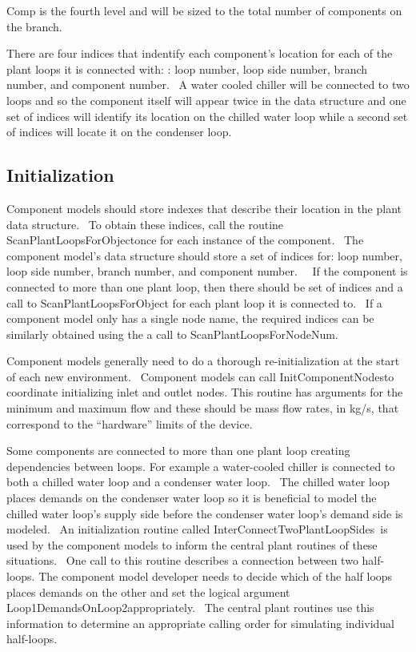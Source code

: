 Comp is the fourth level and will be sized to the total number of components on the branch.

There are four indices that indentify each component's location for each of the plant loops it is connected with: : loop number, loop side number, branch number, and component number.~ A water cooled chiller will be connected to two loops and so the component itself will appear twice in the data structure and one set of indices will identify its location on the chilled water loop while a second set of indices will locate it on the condenser loop.~~

\subsection{Initialization}\label{initialization}

Component models should store indexes that describe their location in the plant data structure.~ To obtain these indices, call the routine ScanPlantLoopsForObjectonce for each instance of the component.~ The component model's data structure should store a set of indices for: loop number, loop side number, branch number, and component number.~~ If the component is connected to more than one plant loop, then there should be set of indices and a call to ScanPlantLoopsForObject for each plant loop it is connected to.~ If a component model only has a single node name, the required indices can be similarly obtained using the a call to ScanPlantLoopsForNodeNum.

Component models generally need to do a thorough re-initialization at the start of each new environment.~ Component models can call InitComponentNodesto coordinate initializing inlet and outlet nodes. This routine has arguments for the minimum and maximum flow and these should be mass flow rates, in kg/s, that correspond to the ``hardware'' limits of the device.

Some components are connected to more than one plant loop creating dependencies between loops. For example a water-cooled chiller is connected to both a chilled water loop and a condenser water loop.~ The chilled water loop places demands on the condenser water loop so it is beneficial to model the chilled water loop's supply side before the condenser water loop's demand side is modeled.~ An initialization routine called InterConnectTwoPlantLoopSides~is used by the component models to inform the central plant routines of these situations.~ One call to this routine describes a connection between two half-loops. The component model developer needs to decide which of the half loops places demands on the other and set the logical argument Loop1DemandsOnLoop2appropriately.~ The central plant routines use this information to determine an appropriate calling order for simulating individual half-loops.

